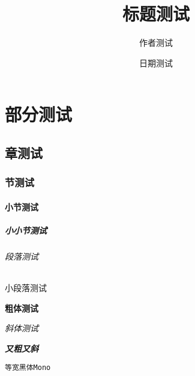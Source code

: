 \documentclass{ctexbook}
\title{标题测试}
\author{作者测试}
\date{日期测试}
\begin{document}
\maketitle
\part{部分测试}
\chapter{章测试}
\section{节测试}
\subsection{小节测试}
\subsubsection{小小节测试}
\paragraph{段落测试}
\subparagraph{小段落测试}

\textbf{粗体测试}

\textit{斜体测试}

\textit{\textbf{又粗又斜}}

\texttt{等宽黑体Mono}
\end{document}
